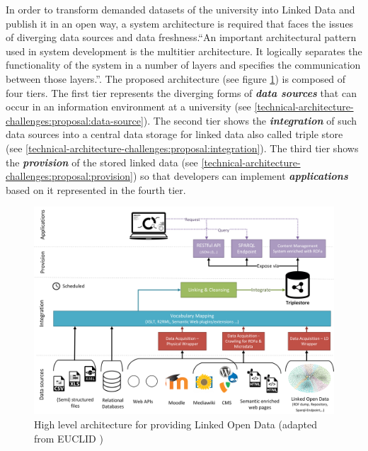 \documentclass{article}
\begin{document}
In order to transform demanded datasets of the university into Linked Data and publish it in an open way, a system architecture is required that faces the issues of diverging data sources and data freshness.\enquote{An important architectural pattern used in system development is the multitier architecture. It logically separates the functionality of the system in a number of layers and specifies the communication between those layers.}\cite{simperl_using_2013}. The proposed architecture (see figure \ref{fig:tac-high-level-architecture}) is composed of four tiers. The first tier represents the diverging forms of \textbf{\textit{data sources}} that can occur in an information environment at a university (see \ref{technical-architecture-challenges:proposal:data-source}). The second tier shows the \textbf{\textit{integration}} of such data sources into a central data storage for linked data also called triple store (see \ref{technical-architecture-challenges:proposal:integration}). The third tier shows the \textbf{\textit{provision}} of the stored linked data (see \ref{technical-architecture-challenges:proposal:provision}) so that developers can implement \textbf{\textit{applications}} based on it represented in the fourth tier.  

\begin{figure}[t]
\centering \includegraphics*[width=1.0\columnwidth]{images/technical-architecture/lod_technical_architecture.png}
\caption{High level architecture for providing Linked Open Data (adapted from EUCLID {\cite{simperl_using_2013}})}
\label{fig:tac-high-level-architecture}
\end{figure}
\end{document}
